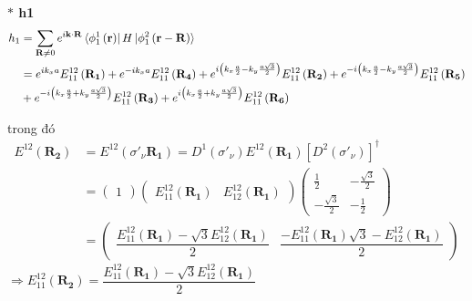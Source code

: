 \documentclass{report}
\begin{document}
\noindent \textbf{ $\ast$ h1}
\begin{align*}
	h_1 & = \sum_{\mathbf{R} \neq 0} e^{i\mathbf{k\cdot R}} \bra*{\phi_1^1 \left(\mathbf{r}\right)} H \ket*{\phi_1^2\left(\mathbf{r}-\mathbf{R}\right)}                                                                                                                                                                       \\
	    & = e^{i k_x a} E_{11}^{12}\left(\mathbf{R_1}\right) + e^{-i k_x a} E_{11}^{12}\left(\mathbf{R_4}\right) + e^{i \left( k_x \frac{a}{2} - k_y \frac{a\sqrt{3}}{2} \right)} E_{11}^{12}\left(\mathbf{R_2}\right) + e^{-i \left( k_x \frac{a}{2} - k_y \frac{a\sqrt{3}}{2} \right)} E_{11}^{12}\left(\mathbf{R_5}\right) \\
	    & + e^{-i \left( k_x \frac{a}{2} + k_y \frac{a\sqrt{3}}{2} \right)} E_{11}^{12}\left(\mathbf{R_3}\right) + e^{i \left( k_x \frac{a}{2} + k_y \frac{a\sqrt{3}}{2} \right)} E_{11}^{12}\left(\mathbf{R_6}\right)
\end{align*}

trong đó
\begin{align*}
	E^{12}(\mathbf{R_2})
	 & = E^{12}(\sigma'_\nu \mathbf{R_1}) = D^1(\sigma'_\nu) E^{12}(\mathbf{R_1}) \left[ D^2(\sigma'_\nu)\right]^\dagger                                                                                                                                                                                                 \\
	 & = \begin{pmatrix}
		     1
	     \end{pmatrix}
	\begin{pmatrix}
		E_{11}^{12}(\mathbf{R_1}) & E_{12}^{12}(\mathbf{R_1})
	\end{pmatrix}
	\begin{pmatrix}
		\frac{1}{2}         & -\frac{\sqrt{3}}{2} \\
		-\frac{\sqrt{3}}{2} & -\frac{1}{2}
	\end{pmatrix}                                                                                                                                                                                                                                                             \\
	 & = \begin{pmatrix}
		     \dfrac{ E_{11}^{12}(\mathbf{R_1}) - \sqrt{3} E_{12}^{12}(\mathbf{R_1})}{2} & \dfrac{ - E_{11}^{12}(\mathbf{R_1})\sqrt{3} -  E_{12}^{12}(\mathbf{R_1})}{2}
	     \end{pmatrix}
\end{align*}
$\Rightarrow E_{11}^{12}(\mathbf{R_2}) =  \dfrac{ E_{11}^{12}(\mathbf{R_1}) - \sqrt{3} E_{12}^{12}(\mathbf{R_1})}{2} $
\end{document}
